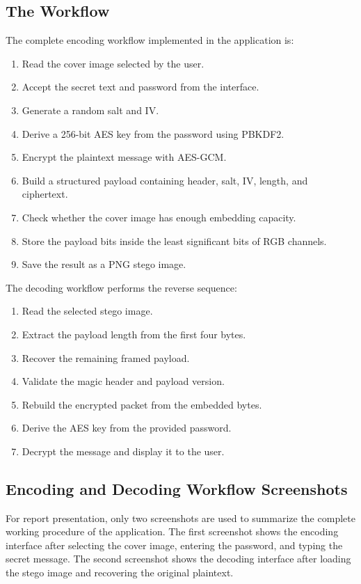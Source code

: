 \documentclass[12pt]{report}
\begin{document}
\subsection{The Workflow}
The complete encoding workflow implemented in the application is:
\begin{enumerate}
    \item Read the cover image selected by the user.
    \item Accept the secret text and password from the interface.
    \item Generate a random salt and IV.
    \item Derive a 256-bit AES key from the password using PBKDF2.
    \item Encrypt the plaintext message with AES-GCM.
    \item Build a structured payload containing header, salt, IV, length, and ciphertext.
    \item Check whether the cover image has enough embedding capacity.
    \item Store the payload bits inside the least significant bits of RGB channels.
    \item Save the result as a PNG stego image.
\end{enumerate}

The decoding workflow performs the reverse sequence:
\begin{enumerate}
    \item Read the selected stego image.
    \item Extract the payload length from the first four bytes.
    \item Recover the remaining framed payload.
    \item Validate the magic header and payload version.
    \item Rebuild the encrypted packet from the embedded bytes.
    \item Derive the AES key from the provided password.
    \item Decrypt the message and display it to the user.
\end{enumerate}

\subsection{Encoding and Decoding Workflow Screenshots}
For report presentation, only two screenshots are used to summarize the complete working procedure of the application. The first screenshot shows the encoding interface after selecting the cover image, entering the password, and typing the secret message. The second screenshot shows the decoding interface after loading the stego image and recovering the original plaintext.
\end{document}
